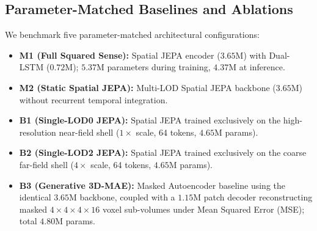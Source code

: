 \documentclass{svproc}
\begin{document}
\subsection{Parameter-Matched Baselines and Ablations}
We benchmark five parameter-matched architectural configurations:
\begin{itemize}
    \item \textbf{M1 (Full Squared Sense):} Spatial JEPA encoder ($3.65\text{M}$) with Dual-LSTM ($0.72\text{M}$); $5.37\text{M}$ parameters during training, $4.37\text{M}$ at inference.
    \item \textbf{M2 (Static Spatial JEPA):} Multi-LOD Spatial JEPA backbone ($3.65\text{M}$) without recurrent temporal integration.
    \item \textbf{B1 (Single-LOD0 JEPA):} Spatial JEPA trained exclusively on the high-resolution near-field shell ($1\times$ scale, 64 tokens, $4.65\text{M}$ params).
    \item \textbf{B2 (Single-LOD2 JEPA):} Spatial JEPA trained exclusively on the coarse far-field shell ($4\times$ scale, 64 tokens, $4.65\text{M}$ params).
    \item \textbf{B3 (Generative 3D-MAE):} Masked Autoencoder baseline using the identical $3.65\text{M}$ backbone, coupled with a $1.15\text{M}$ patch decoder reconstructing masked $4 \times 4 \times 4 \times 16$ voxel sub-volumes under Mean Squared Error (MSE); total $4.80\text{M}$ params.
\end{itemize}
\end{document}
